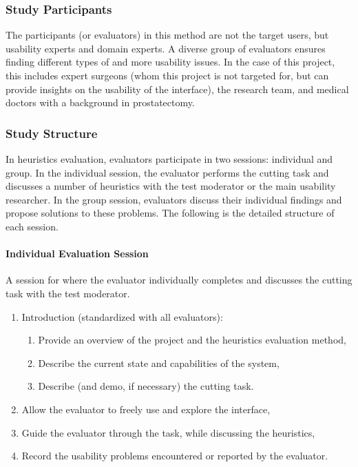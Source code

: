 \subsubsection{Study Participants}
The participants (or evaluators) in this method are not the target users, but usability experts and domain experts. A diverse group of evaluators ensures finding different types of and more usability issues. In the case of this project, this includes expert surgeons (whom this project is not targeted for, but can provide insights on the usability of the interface), the research team, and medical doctors with a background in prostatectomy.

\subsubsection{Study Structure}
In heuristics evaluation, evaluators participate in two sessions: individual and group. In the individual session, the evaluator performs the cutting task and discusses a number of heuristics with the test moderator or the main usability researcher. In the group session, evaluators discuss their individual findings and propose solutions to these problems. The following is the detailed structure of each session.

\paragraph{Individual Evaluation Session} A session for where the evaluator individually completes and discusses the cutting task with the test moderator.
\begin{enumerate}[1.]
  \item Introduction (standardized with all evaluators):
  \begin{enumerate}[\em a\em)]
  \item Provide an overview of the project and the heuristics evaluation method,
  \item Describe the current state and capabilities of the system,
  \item Describe (and demo, if necessary) the cutting task.
  \end{enumerate}
  \item Allow the evaluator to freely use and explore the interface,
  \item Guide the evaluator through the task, while discussing the heuristics,
  \item Record the usability problems encountered or reported by the evaluator.
\end{enumerate}


